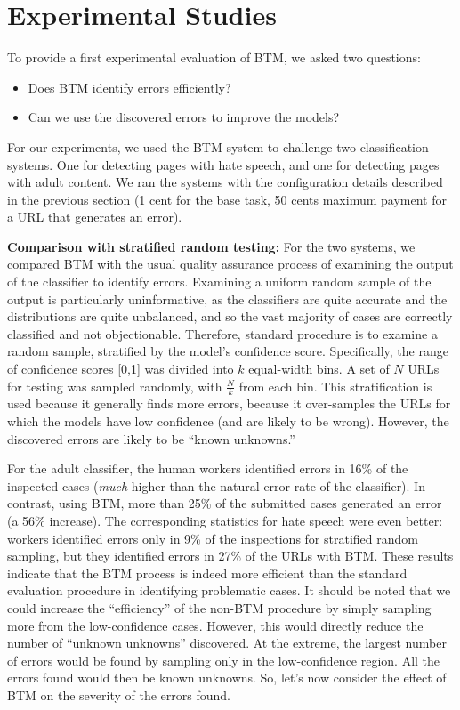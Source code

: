 \section{Experimental Studies}

To provide a first experimental evaluation of BTM, we asked two questions:
\begin{itemize}

\item Does BTM identify errors efficiently?

\item Can we use the discovered errors to improve the models?

\end{itemize}

For our experiments, we used the BTM system to challenge two
classification systems. One for detecting pages with hate speech, and
one for detecting pages with adult content. We ran the systems with
the configuration details described in the previous section (1 cent
for the base task, 50 cents maximum payment for a URL that generates
an error).

\textbf{Comparison with stratified random testing:} For the two systems, we compared BTM with the usual quality assurance process of examining the output of the classifier to identify errors.  Examining a uniform random sample of the output is particularly uninformative, as the classifiers are quite accurate and the distributions are quite unbalanced, and so the vast majority of cases are correctly classified and not objectionable.  Therefore, standard procedure is to examine a random sample, stratified by the model's confidence score.  Specifically, the range of confidence scores [0,1] was divided into $k$ equal-width bins.  A set of $N$ URLs for testing was sampled randomly, with $\frac{N}{k}$ from each bin.  This stratification is used because it generally finds more errors, because it over-samples the URLs for which the models have low confidence (and are likely to be wrong).  However, the discovered errors are likely to be ``known unknowns.''  

For the adult classifier, the human workers identified errors in 16\% of the inspected cases (\textit{much} higher than the natural error rate of the classifier).  In contrast, using BTM, more than 25\% of the submitted cases generated an error (a 56\% increase). The corresponding statistics for hate speech were even better: workers identified errors only in 9\% of the inspections for stratified random sampling, but they identified errors in 27\% of the URLs with BTM. These results indicate that the BTM process is indeed more efficient than the standard evaluation procedure in identifying problematic cases.  It should be noted that we could increase the ``efficiency'' of the non-BTM procedure by simply sampling more from the low-confidence cases.  However, this would directly reduce the number of ``unknown unknowns'' discovered.  At the extreme, the largest number of errors would be found by sampling only in the low-confidence region.  All the errors found would then be known unknowns.  So, let's now consider the effect of BTM on the severity of the errors found.

